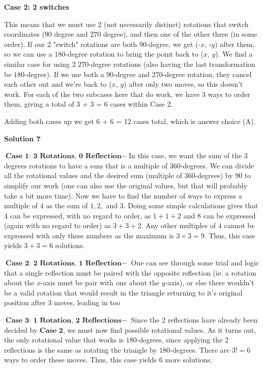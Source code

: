 \begin{enumerate}
 \textbf{Case 2: 2 switches}

 This means that we must use 2 (not necessarily distinct) rotations that switch coordinates ($90$ degree and $270$ degree), and then one of the other three (in some order). If our 2 "switch" rotations are both $90$-degree, we get (-$x$, -$y$) after them, so we can use a $180$-degree rotation to bring the point back to ($x$, $y$). We find a similar case for using 2 $270$-degree rotations (also having the last transformation be $180$-degree). If we use both a $90$-degree and $270$-degree rotation, they cancel each other out and we're back to ($x$, $y$) after only two moves, so this doesn't work. For each of the two subcases here that do work, we have 3 ways to order them, giving a total of 3 + 3 = 6 cases within Case 2.

 Adding both cases up we get 6 + 6 = 12 cases total, which is answer choice (A).

 



\textbf{Solution 7}

$\textbf{Case 1: 3 Rotations, 0 Reflection}-$In this case, we want the sum of the $3$ degrees rotations to have a sum that is a multiple of $360$-degrees. We can divide all the rotational values and the desired sum (multiple of $360$-degrees) by 90 to simplify our work (one can also use the original values, but that will probably take a bit more time). Now we have to find the number of ways to express a multiple of $4$ as the sum of $1,2,$ and $3$. Doing some simple calculations gives that $4$ can be expressed, with no regard to order, as $1+1+2$ and 8 can be expressed (again with no regard to order) as $3+3+2$. Any other multiples of $4$ cannot be expressed with only these numbers as the maximum is $3 \times 3=9$. Thus, this case yields $3+3=6$ solutions.

 $\textbf{Case 2: 2 Rotations, 1 Reflection}-$ One can see through some trial and logic that a single reflection must be paired with the opposite reflection (ie. a rotation about the $x$-axis must be pair with one about the $y$-axis), or else there wouldn't be a valid rotation that would result in the triangle returning to it's original position after 3 moves, leading in too

 $\textbf{Case 3: 1 Rotation, 2 Reflections}-$ Since the $2$ reflections have already been decided by $\textbf{Case 2}$, we must now find possible rotational values. As it turns out, the only rotational value that works is $180$-degrees, since applying the 2 reflections is the same as rotating the triangle by $180$-degrees. There are $3!=6$ ways to order these moves. Thus, this case yields $6$ more solutions. 


\end{enumerate}
